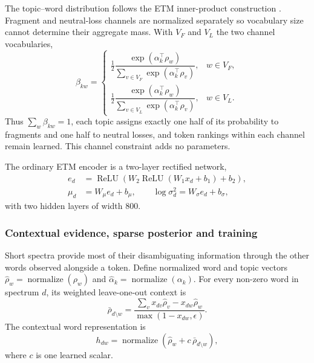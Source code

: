 \documentclass[10pt,a4paper]{article}
\newcommand{\normalize}{\operatorname{normalize}}
\begin{document}
The topic--word distribution follows the ETM inner-product construction
\cite{dieng2020}. Fragment and neutral-loss channels are normalized separately
so vocabulary size cannot determine their aggregate mass. With $V_F$ and $V_L$
the two channel vocabularies,
\begin{equation}
  \beta_{kw}=
  \begin{cases}
    \tfrac12
    \dfrac{\exp(\alpha_k^\top\rho_w)}
    {\sum_{v\in V_F}\exp(\alpha_k^\top\rho_v)}, & w\in V_F,\\[8pt]
    \tfrac12
    \dfrac{\exp(\alpha_k^\top\rho_w)}
    {\sum_{v\in V_L}\exp(\alpha_k^\top\rho_v)}, & w\in V_L.
  \end{cases}
  \label{eq:beta}
\end{equation}
Thus $\sum_w\beta_{kw}=1$, each topic assigns exactly one half of its
probability to fragments and one half to neutral losses, and token rankings
within each channel remain learned. This channel constraint adds no parameters.

The ordinary ETM encoder is a two-layer rectified network,
\begin{align}
  e_d &= \operatorname{ReLU}
  \left(W_2\operatorname{ReLU}(W_1x_d+b_1)+b_2\right),\\
  \mu_d &= W_\mu e_d+b_\mu,\qquad
  \log\sigma_d^2=W_\sigma e_d+b_\sigma,
  \label{eq:encoder}
\end{align}
with two hidden layers of width 800.

\subsubsection{Contextual evidence, sparse posterior and training}

Short spectra provide most of their disambiguating information through the
other words observed alongside a token. Define normalized word and topic
vectors $\widehat\rho_w=\normalize(\rho_w)$ and
$\widehat\alpha_k=\normalize(\alpha_k)$. For every non-zero word in spectrum
$d$, its weighted leave-one-out context is
\begin{equation}
  \bar\rho_{d\setminus w}=
  \frac{\sum_v x_{dv}\widehat\rho_v-x_{dw}\widehat\rho_w}
       {\max(1-x_{dw},\epsilon)}.
  \label{eq:loo-context}
\end{equation}
The contextual word representation is
\begin{equation}
  h_{dw}=\normalize\!\left(
  \widehat\rho_w+c\,\bar\rho_{d\setminus w}\right),
  \label{eq:contextual-word}
\end{equation}
where $c$ is one learned scalar.
\end{document}
